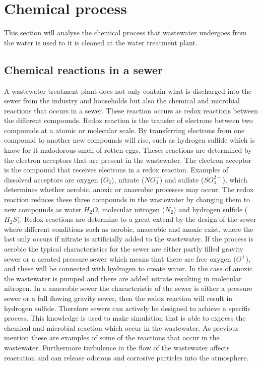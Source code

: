 \section{Chemical process}\label{se:chemical_process}
This section will analyse the chemical process that wastewater undergoes from the water is used to it is cleaned at the water treatment plant. 

\subsection{Chemical reactions in a sewer}\label{subse:chemical_reactions_in_a_sewer}
A wastewater treatment plant does not only contain what is discharged into the sewer from the industry and households but also the chemical and microbial reactions that occurs in a sewer. These reaction occurs as redox reactions between the different compounds. Redox reaction is the transfer of electrons between two compounds at a atomic or molecular scale. By transferring electrons from one compound to another new compounds will rise, such as hydrogen sulfide which is know for it malodorous smell of rotten eggs.  Theses reactions are determined by the electron acceptors that are present in the wastewater. The electron acceptor is the compound that receives electrons in a redox reaction. Examples of dissolved acceptors are oxygen ($O_2$), nitrate ($NO^-_3$) and sulfate ($SO^{2-}_4$), which determines whether aerobic, anoxic or anaerobic processes may occur. The redox reaction reduces these three compounds in the wastewater by changing them to new compounds as water $H_2O$, molecular nitrogen ($N_2$) and hydrogen sulfide ($H_2S$). Redox reactions are determine to a great extend by the design of the sewer where different conditions such as aerobic, anaerobic and anoxic exist, where the last only occurs if nitrate is artificially added to the wastewater. If the process is aerobic the typical characteristics for the sewer are either partly filled gravity sewer or a aerated pressure sewer which means that there are free oxygen ($O^+$), and these will be connected with hydrogen to create water. In the case of anoxic the wastewater is pumped and there are added nitrate resulting in molecular nitrogen. In a anaerobic sewer the characteristic of the sewer is either a pressure sewer or a full flowing gravity sewer, then the redox reaction will result in hydrogen sulfide. Therefore sewers can actively be designed to achieve a specific process. This knowledge is used to make simulation that is able to express the chemical and microbial reaction which occur in the wastewater. As previous mention these are examples of some of the reactions that occur in the wastewater. Furthermore turbulence in the flow of the wastewater affects reaeration and can release odorous and corrosive particles into the atmosphere.    

